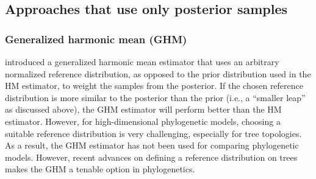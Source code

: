 \subsection{Approaches that use only posterior samples}

\subsubsection{Generalized harmonic mean (GHM)}
\citet{Gelfand1994} introduced a generalized harmonic mean
estimator that uses an arbitrary normalized reference distribution, as
opposed to the prior distribution used in the HM estimator, to weight the
samples from the posterior.
If the chosen reference distribution is more similar to the posterior than the
prior (i.e., a ``smaller leap'' as discussed above), the GHM estimator will
perform better than the HM estimator.
However, for high-dimensional phylogenetic models, choosing a suitable
reference distribution is very challenging, especially for tree topologies.
As a result, the GHM estimator has not been used for comparing phylogenetic
models.
However, recent advances on defining a reference distribution on trees
\citep{Holder2014,Baele2016} makes the GHM a tenable option in phylogenetics.


